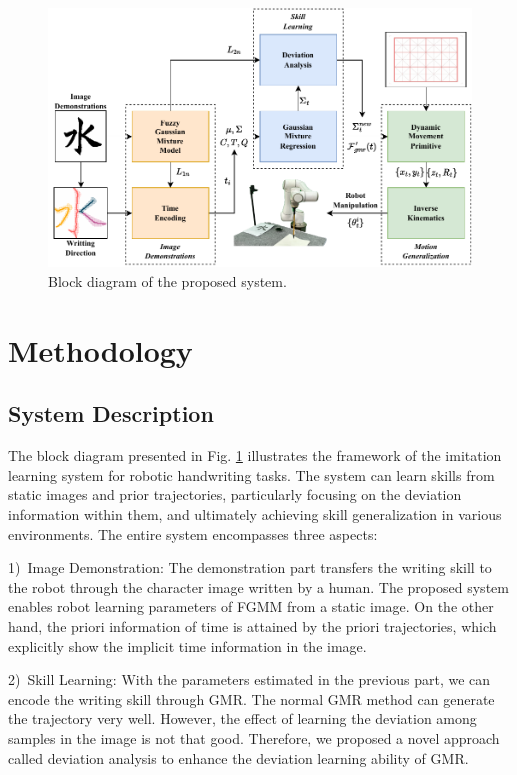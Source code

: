 \documentclass[journal]{IEEEtran}
\begin{document}
\begin{figure}[!t]
    \centering
    \includegraphics[width=6in]{./fig/fig1.pdf}
    \caption{Block diagram of the proposed system.}
    \label{fig1}
\end{figure}

\section{Methodology}
\subsection{System Description}
The block diagram presented in Fig. \ref{fig1} illustrates the framework of the imitation learning system for robotic handwriting tasks. The system can learn skills from static images and prior trajectories, particularly focusing on the deviation information within them, and ultimately achieving skill generalization in various environments. The entire system encompasses three aspects:

1)~Image Demonstration: The demonstration part transfers the writing skill to the robot through the character image written by a human. The proposed system enables robot learning parameters of FGMM from a static image. On the other hand, the priori information of time is attained by the priori trajectories, which explicitly show the implicit time information in the image.

2)~Skill Learning: With the parameters estimated in the previous part, we can encode the writing skill through GMR. The normal GMR method can generate the trajectory very well. However, the effect of learning the deviation among samples in the image is not that good. Therefore, we proposed a novel approach called deviation analysis to enhance the deviation learning ability of GMR.
\end{document}

